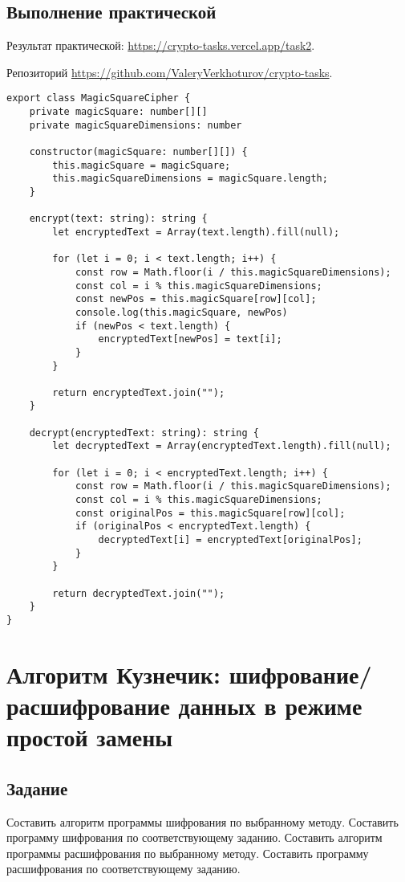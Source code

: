 \subsection{Выполнение практической}

Результат практической: \url{https://crypto-tasks.vercel.app/task2}.

Репозиторий \url{https://github.com/ValeryVerkhoturov/crypto-tasks}.

\begin{lstlisting}[caption={Шифр Магический квадрат}, label=lst:2]
export class MagicSquareCipher {
	private magicSquare: number[][]
	private magicSquareDimensions: number
	
	constructor(magicSquare: number[][]) {
		this.magicSquare = magicSquare;
		this.magicSquareDimensions = magicSquare.length;
	}
	
	encrypt(text: string): string {
		let encryptedText = Array(text.length).fill(null);
		
		for (let i = 0; i < text.length; i++) {
			const row = Math.floor(i / this.magicSquareDimensions);
			const col = i % this.magicSquareDimensions;
			const newPos = this.magicSquare[row][col];
			console.log(this.magicSquare, newPos)
			if (newPos < text.length) {
				encryptedText[newPos] = text[i];
			}
		}
		
		return encryptedText.join("");
	}
	
	decrypt(encryptedText: string): string {
		let decryptedText = Array(encryptedText.length).fill(null);
		
		for (let i = 0; i < encryptedText.length; i++) {
			const row = Math.floor(i / this.magicSquareDimensions);
			const col = i % this.magicSquareDimensions;
			const originalPos = this.magicSquare[row][col];
			if (originalPos < encryptedText.length) {
				decryptedText[i] = encryptedText[originalPos];
			}
		}
		
		return decryptedText.join("");
	}
}
\end{lstlisting}

\section{Алгоритм Кузнечик: шифрование/расшифрование данных в режиме простой замены}

\subsection{Задание}

Составить алгоритм программы шифрования по выбранному методу.
Составить программу шифрования по соответствующему заданию. 
Составить алгоритм программы расшифрования по выбранному
методу.
Составить программу расшифрования по соответствующему заданию.

